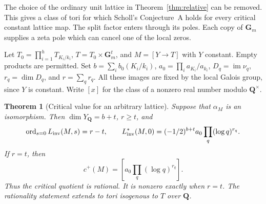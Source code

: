 \documentclass[11pt]{amsart}
\numberwithin{equation}{section}
\newtheorem{theorem}{Theorem}[section]
\theoremstyle{definition}
\theoremstyle{remark}
\newcommand{\Q}{\mathbf Q}
\newcommand{\Gm}{\mathbf G_m}
\newcommand{\ord}{\operatorname{ord}}
\newcommand{\im}{\operatorname{im}}
\begin{document}
The choice of the ordinary unit lattice in Theorem~\ref{thm:relative}
can be removed. This gives a class of tori for which Scholl's
Conjecture~A holds for every critical constant lattice map. The split factor enters through its poles. Each copy of $\Gm$ supplies a
zeta pole which can cancel one of the local zeros.

Let $T_0=\prod_{i=1}^h T_{K_i/k_i}$, $T=T_0\times\Gm^t$, and
$M=[Y\to T]$ with $Y$ constant. Empty products are permitted.
Set $b=\sum_i b_0(K_i/k_i)$,
$a_0=\prod_i a_{K_i}/a_{k_i}$,
$D_q=\im\nu_q$, $r_q=\dim D_q$, and $r=\sum_q r_q$.
All these images are fixed by the local Galois group, since $Y$ is
constant. Write $[x]$ for the class of a nonzero real number modulo
$\Q^\times$.

\begin{theorem}[Critical value for an arbitrary lattice]\label{thm:allcritical}
Suppose that $\alpha_M$ is an isomorphism. Then $\dim Y_\Q=b+t$,
$r\ge t$, and
\begin{equation}\label{eq:arbitrary-leading}
 \ord_{s=0}L_{\rm inv}(M,s)=r-t,\qquad
 L_{\rm inv}^*(M,0)=(-1/2)^{b+t}a_0\prod_q(\log q)^{r_q}.
\end{equation}
If $r=t$, then
\[
 c^+(M)=\left[a_0\prod_q(\log q)^{r_q}\right].
\]
Thus the critical quotient is rational. It is nonzero exactly when
$r=t$. The rationality statement extends to tori isogenous to $T$
over $\Q$.
\end{theorem}
\end{document}
